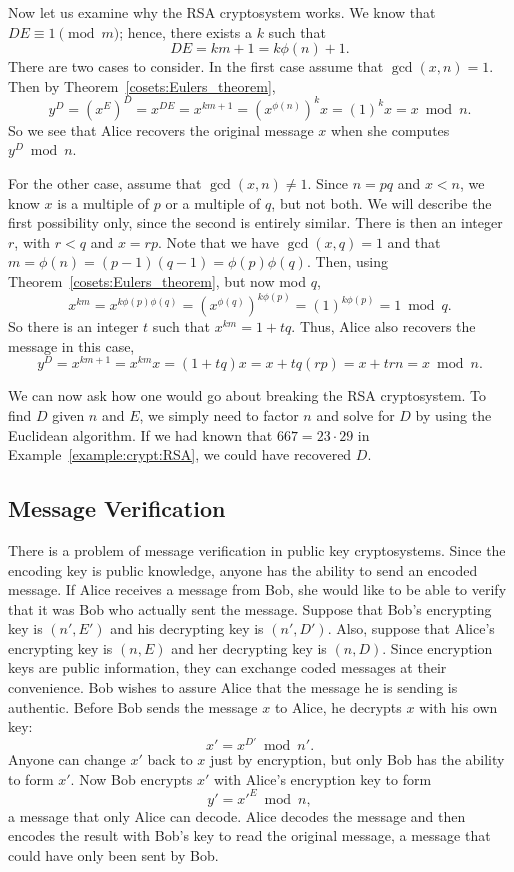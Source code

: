 
Now let us examine why the RSA cryptosystem works.  We know that $DE
\equiv 1 \pmod{ m}$; hence, there exists a $k$ such that 
\[
DE = km + 1 = k \phi(n) + 1.
\]
There are two cases to consider.  In the first case assume that $\gcd(x, n) = 1$.  Then by Theorem~\ref{cosets:Eulers_theorem},
\[
y^D = (x^E)^D = x^{DE} = x^{km+1} = (x^{\phi(n)})^k x
= (1)^k x= x \bmod n.
\]
So we see that Alice recovers the original message $x$ when
she computes $y^D \bmod n$.

For the other case, assume that $\gcd(x, n) \neq 1$.  Since
$n=pq$ and $x < n$, we know $x$ is a multiple of $p$ or a multiple
of $q$, but not both.  We will describe the first possibility only,
since the second is entirely similar.  There is then an integer $r$,
with $r < q$ and $x=rp$.  Note that we have $\gcd(x, q) = 1$
and that $m=\phi(n)=(p-1)(q-1)=\phi(p)\phi(q)$.  Then, using
Theorem~\ref{cosets:Eulers_theorem}, but now mod $q$,
\[
x^{km} = x^{k\phi(p)\phi(q)} = (x^{\phi(q)})^{k\phi(p)}
= (1)^{k\phi(p)} = 1 \bmod q.
\]
So there is an integer $t$ such that $x^{km}=1 + tq$.
Thus, Alice also recovers the message in this case,
\[
y^D = x^{km+1} = x^{km} x = (1+tq) x
= x + tq(rp) = x + trn = x \bmod n.
\]


We can now ask how one would go about breaking the RSA cryptosystem.
To find $D$ given $n$ and $E$, we simply need to factor $n$ and solve
for $D$ by using the Euclidean algorithm. If we had known that $667 =
23 \cdot 29$ in Example~\ref{example:crypt:RSA}, we could have recovered $D$.    
 
 
 
\subsection*{Message Verification}
 
 
There is a problem of message verification in public key
cryptosystems. Since the encoding key is public knowledge, anyone has
the ability to send an encoded message.  If Alice receives a message
from Bob, she would like to be able to verify that it was Bob who
actually sent the message. Suppose that Bob's encrypting key is $(n',
E')$ and his decrypting key is $(n', D')$.  Also, suppose that Alice's
encrypting key is $(n, E)$ and her decrypting key is $(n, D)$.  Since
encryption keys are public information, they can exchange coded
messages at their convenience.  Bob wishes to assure Alice that the
message he is sending is authentic. Before Bob sends the message $x$
to Alice, he decrypts  $x$ with his own key:
\[
x' = x ^{D'} \bmod n'.
\]
Anyone can change $x'$ back to $x$ just by encryption, but only Bob
has the ability to form $x'$. Now Bob encrypts $x'$ with Alice's
encryption key to form 
\[
y' = {x'}^E  \bmod n,
\]
a message that only Alice can decode.  Alice decodes the message and
then encodes the result with Bob's key to read the original message, a
message that could have only been sent by Bob.
 
